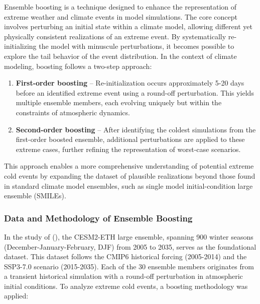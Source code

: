 \documentclass[
]{krantz}
\begin{document}
Ensemble boosting is a technique designed to enhance the representation of extreme weather and climate events in model simulations. The core concept involves perturbing an initial state within a climate model, allowing different yet physically consistent realizations of an extreme event. By systematically re-initializing the model with minuscule perturbations, it becomes possible to explore the tail behavior of the event distribution.
In the context of climate modeling, boosting follows a two-step approach:

\begin{enumerate}
\def\labelenumi{\arabic{enumi}.}
\item
  \textbf{First-order boosting} -- Re-initialization occurs approximately 5-20 days before an identified extreme event using a round-off perturbation. This yields multiple ensemble members, each evolving uniquely but within the constraints of atmospheric dynamics.
\item
  \textbf{Second-order boosting} -- After identifying the coldest simulations from the first-order boosted ensemble, additional perturbations are applied to these extreme cases, further refining the representation of worst-case scenarios.
\end{enumerate}

This approach enables a more comprehensive understanding of potential extreme cold events by expanding the dataset of plausible realizations beyond those found in standard climate model ensembles, such as single model initial-condition large ensemble (SMILEs).

\subsubsection{Data and Methodology of Ensemble Boosting}\label{data-and-methodology-of-ensemble-boosting}

In the study of (\citet{sippel2024}), the CESM2-ETH large ensemble, spanning 900 winter seasons (December-January-February, DJF) from 2005 to 2035, serves as the foundational dataset. This dataset follows the CMIP6 historical forcing (2005-2014) and the SSP3-7.0 scenario (2015-2035). Each of the 30 ensemble members originates from a transient historical simulation with a round-off perturbation in atmospheric initial conditions. To analyze extreme cold events, a boosting methodology was applied:
\end{document}
